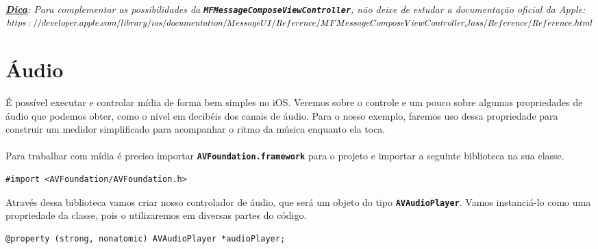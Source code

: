 \documentclass[a4paper,12pt,brazil,doubleside]{book}
\begin{document}
\paragraph{}\textit{\textbf{\underline{Dica}}: Para complementar as possibilidades da \texttt{\textbf{MFMessageComposeViewController}}, não deixe de estudar a documentação oficial da Apple:\\
\(https://developer.apple.com/library/ios/documentation/MessageUI/Reference/\\MFMessageComposeViewController_class/Reference/Reference.html\)}

\bigskip


\section{Áudio}

É possível executar e controlar mídia de forma bem simples no iOS. Veremos sobre o controle e um pouco sobre algumas propriedades de áudio que podemos obter, como o nível em decibéis dos canais de áudio. Para o nosso exemplo, faremos uso dessa propriedade para construir um medidor simplificado para acompanhar o ritmo da música enquanto ela toca.
\paragraph{}Para trabalhar com mídia é preciso importar \texttt{\textbf{AVFoundation.framework}} para o projeto e importar a seguinte biblioteca na sua classe.

\begin{listing}
\begin{verbatim}
#import <AVFoundation/AVFoundation.h>
\end{verbatim}
\end{listing}

Através dessa biblioteca vamos criar nosso controlador de áudio, que será um objeto do tipo \texttt{\textbf{AVAudioPlayer}}. Vamos instanciá-lo como uma propriedade da classe, pois o utilizaremos em diversas partes do código.

\begin{listing}
\begin{verbatim}
@property (strong, nonatomic) AVAudioPlayer *audioPlayer;
\end{verbatim}
\end{listing}
\end{document}
